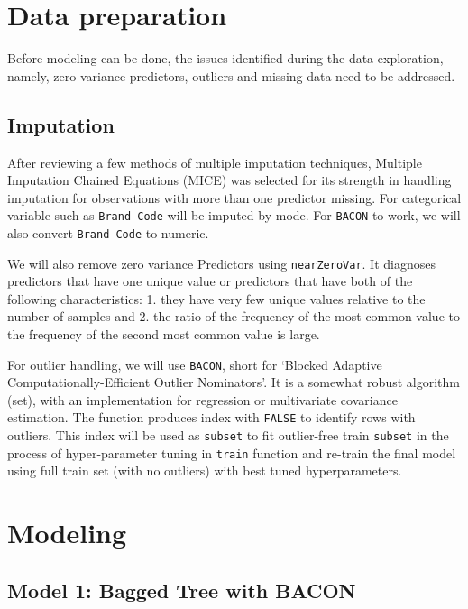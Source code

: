 \documentclass[]{report}
\begin{document}
\chapter{Data preparation}\label{data-preparation}

Before modeling can be done, the issues identified during the data
exploration, namely, zero variance predictors, outliers and missing data
need to be addressed.

\section{Imputation}\label{imputation}

After reviewing a few methods of multiple imputation techniques,
Multiple Imputation Chained Equations (MICE) was selected for its
strength in handling imputation for observations with more than one
predictor missing. For categorical variable such as \texttt{Brand\ Code}
will be imputed by mode. For \texttt{BACON} to work, we will also
convert \texttt{Brand\ Code} to numeric.

We will also remove zero variance Predictors using \texttt{nearZeroVar}.
It diagnoses predictors that have one unique value or predictors that
have both of the following characteristics: 1. they have very few unique
values relative to the number of samples and 2. the ratio of the
frequency of the most common value to the frequency of the second most
common value is large.

For outlier handling, we will use \texttt{BACON}, short for `Blocked
Adaptive Computationally-Efficient Outlier Nominators'. It is a somewhat
robust algorithm (set), with an implementation for regression or
multivariate covariance estimation. The function produces index with
\texttt{FALSE} to identify rows with outliers. This index will be used
as \texttt{subset} to fit outlier-free train \texttt{subset} in the
process of hyper-parameter tuning in \texttt{train} function and
re-train the final model using full train set (with no outliers) with
best tuned hyperparameters.

\chapter{Modeling}\label{modeling}

\section{Model 1: Bagged Tree with
BACON}\label{model-1-bagged-tree-with-bacon}
\end{document}
